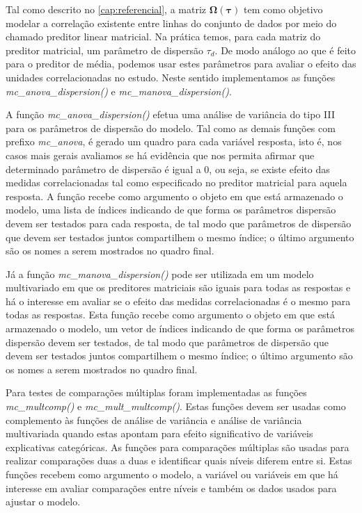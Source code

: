 Tal como descrito no \autoref{cap:referencial}, a matriz $\boldsymbol{\Omega({\tau})}$ tem como objetivo modelar a correlação existente entre linhas do conjunto de dados por meio do chamado preditor linear matricial. Na prática temos, para cada matriz do preditor matricial, um parâmetro de dispersão $\tau_d$. De modo análogo ao que é feito para o preditor de média, podemos usar estes parâmetros para avaliar o efeito das unidades correlacionadas no estudo. Neste sentido implementamos as funções \emph{mc\_anova\_dispersion()} e \emph{mc\_manova\_dispersion()}. 

A função \emph{mc\_anova\_dispersion()} efetua uma análise de variância do tipo III para os parâmetros de dispersão do modelo. Tal como as demais funções com prefixo \emph{mc\_anova}, é gerado um quadro para cada variável resposta, isto é, nos casos mais gerais avaliamos se há evidência que nos permita afirmar que determinado parâmetro de dispersão é igual a 0, ou seja, se existe efeito das medidas correlacionadas tal como especificado no preditor matricial para aquela resposta. A função recebe como argumento o objeto em que está armazenado o modelo, uma lista de índices indicando de que forma os parâmetros dispersão devem ser testados para cada resposta, de tal modo que parâmetros de dispersão que devem ser testados juntos compartilhem o mesmo índice; o último argumento são os nomes a serem mostrados no quadro final.

Já a função \emph{mc\_manova\_dispersion()} pode ser utilizada em um modelo multivariado em que os preditores matriciais são iguais para todas as respostas e há o interesse em avaliar se o efeito das medidas correlacionadas é o mesmo para todas as respostas. Esta função recebe como argumento o objeto em que está armazenado o modelo, um vetor de índices indicando de que forma os parâmetros dispersão devem ser testados, de tal modo que parâmetros de dispersão que devem ser testados juntos compartilhem o mesmo índice; o último argumento são os nomes a serem mostrados no quadro final.

Para testes de comparações múltiplas foram implementadas as funções \emph{mc\_multcomp()} e \emph{mc\_mult\_multcomp()}. Estas funções devem ser usadas como complemento às funções de análise de variância e análise de variância multivariada quando estas apontam para efeito significativo de variáveis explicativas categóricas. As funções para comparações múltiplas são usadas para realizar comparações duas a duas e identificar quais níveis diferem entre si. Estas funções recebem como argumento o modelo, a variável ou variáveis em que há interesse em avaliar comparações entre níveis e também os dados usados para ajustar o modelo.

